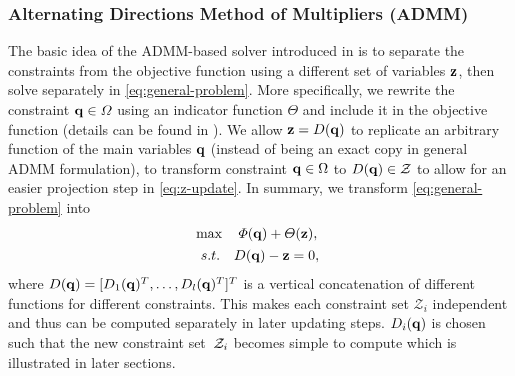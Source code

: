 \documentclass[10pt,twocolumn,twoside]{IEEEtran}
\def\sZ{\mathcal{Z}}
\begin{document}
\subsubsection{Alternating Directions Method of Multipliers (ADMM)}\label{chapter:ADMM review}
The basic idea of the ADMM-based solver introduced in \cite{yang2020multi} is to separate the constraints from the objective function using a different set of variables $\mathbf{z}$, then solve separately in \eqref{eq:general-problem}.
More specifically, we rewrite the constraint $\mathbf{q}\in\varOmega$ using an indicator function $\varTheta$ and include it in the objective function (details can be found in \cite{yang2020multi}). 
We allow $\mathbf{z} = D(\mathbf{q})$ to replicate an arbitrary function of the main variables $\mathbf{q}$ (instead of being an exact copy in general ADMM formulation), to transform constraint $\mathbf{q}\in\Omega$ to $D(\vq) \in \sZ$ to allow for an easier projection step in \cref{eq:z-update}. In summary, we transform \cref{eq:general-problem} into
\begin{equation}\label{eq:ADMMSetConstraint_modified}
	\begin{aligned}
		&\max\quad \varPhi(\vq)+\varTheta(\vz), \\
		& \begin{array}{r@{\quad}c}
			s.t.& D(\vq)-\vz=0,
		\end{array} 
	\end{aligned}
\end{equation}
where $D(\mathbf{q})= [D_1(\mathbf{q})^T,\dots,D_l(\mathbf{q})^T]^T$ is a vertical concatenation of different functions for different constraints. This makes each constraint set $\mathcal{Z}_i$ independent and thus can be computed separately in later updating steps. $D_i(\mathbf{q})$ is chosen such that the new constraint set~$\mathcal{Z}_i$ becomes simple to compute which is illustrated in later sections.
\end{document}

